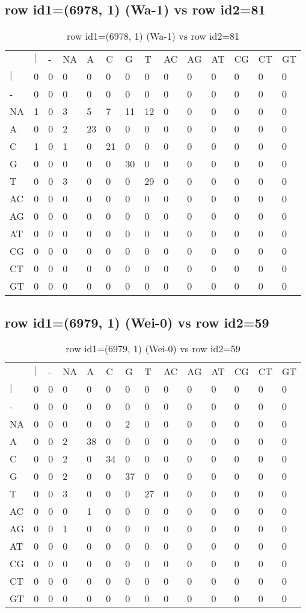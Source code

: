 \subsection{row id1=(6978, 1) (Wa-1) vs row id2=81}
\begin{center}
\begin{longtable}{|l|l|l|l|l|l|l|l|l|l|l|l|l|l|}
\caption{row id1=(6978, 1) (Wa-1) vs row id2=81} \label{table_dm204}\\
\hline
\\
\hline
&$|$&-&NA&A&C&G&T&AC&AG&AT&CG&CT&GT\\
$|$&0&0&0&0&0&0&0&0&0&0&0&0&0\\
-&0&0&0&0&0&0&0&0&0&0&0&0&0\\
NA&1&0&3&5&7&11&12&0&0&0&0&0&0\\
A&0&0&2&23&0&0&0&0&0&0&0&0&0\\
C&1&0&1&0&21&0&0&0&0&0&0&0&0\\
G&0&0&0&0&0&30&0&0&0&0&0&0&0\\
T&0&0&3&0&0&0&29&0&0&0&0&0&0\\
AC&0&0&0&0&0&0&0&0&0&0&0&0&0\\
AG&0&0&0&0&0&0&0&0&0&0&0&0&0\\
AT&0&0&0&0&0&0&0&0&0&0&0&0&0\\
CG&0&0&0&0&0&0&0&0&0&0&0&0&0\\
CT&0&0&0&0&0&0&0&0&0&0&0&0&0\\
GT&0&0&0&0&0&0&0&0&0&0&0&0&0\\
\hline
\end{longtable}
\end{center}

\subsection{row id1=(6979, 1) (Wei-0) vs row id2=59}
\begin{center}
\begin{longtable}{|l|l|l|l|l|l|l|l|l|l|l|l|l|l|}
\caption{row id1=(6979, 1) (Wei-0) vs row id2=59} \label{table_dm206}\\
\hline
\\
\hline
&$|$&-&NA&A&C&G&T&AC&AG&AT&CG&CT&GT\\
$|$&0&0&0&0&0&0&0&0&0&0&0&0&0\\
-&0&0&0&0&0&0&0&0&0&0&0&0&0\\
NA&0&0&0&0&0&2&0&0&0&0&0&0&0\\
A&0&0&2&38&0&0&0&0&0&0&0&0&0\\
C&0&0&2&0&34&0&0&0&0&0&0&0&0\\
G&0&0&2&0&0&37&0&0&0&0&0&0&0\\
T&0&0&3&0&0&0&27&0&0&0&0&0&0\\
AC&0&0&0&1&0&0&0&0&0&0&0&0&0\\
AG&0&0&1&0&0&0&0&0&0&0&0&0&0\\
AT&0&0&0&0&0&0&0&0&0&0&0&0&0\\
CG&0&0&0&0&0&0&0&0&0&0&0&0&0\\
CT&0&0&0&0&0&0&0&0&0&0&0&0&0\\
GT&0&0&0&0&0&0&0&0&0&0&0&0&0\\
\hline
\end{longtable}
\end{center}

